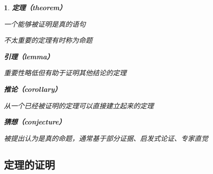 \documentclass[UTF8]{report}
\theoremstyle{MyLineTheoremStyle} %
\theoremstyle{MyBlockTheoremStyle} %
\theoremstyle{MySubsubsectionStyle} %
\newtheorem{definition}{}
\begin{document}
\begin{definition}
    \textbf{定理（theorem）}\par
    一个能够被证明是真的语句\par
    不太重要的定理有时称为命题\par
\vspace{1em} %
    \textbf{引理（lemma）}\par
    重要性略低但有助于证明其他结论的定理\par
\vspace{1em} %
    \textbf{推论（corollary）}\par
    从一个已经被证明的定理可以直接建立起来的定理\par
\vspace{1em} %
    \textbf{猜想（conjecture）}\par
    被提出认为是真的命题，通常基于部分证据、启发式论证、专家直觉\par
\end{definition}


\subsection{定理的证明}
\end{document}

